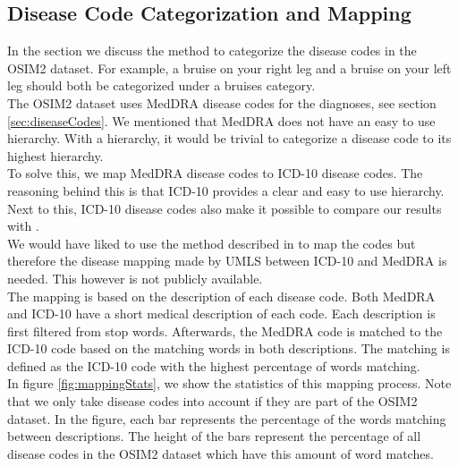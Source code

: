 \subsection{Disease Code Categorization and Mapping}
\label{sec:mapping}

In the section we discuss the method to categorize the disease codes in the OSIM2 dataset.  For example, a bruise on your right leg and a bruise on your left leg should both be categorized under a bruises category. \\

The OSIM2 dataset uses MedDRA disease codes for the diagnoses, see section \ref{sec:diseaseCodes}. We mentioned that MedDRA does not have an easy to use hierarchy. With a hierarchy, it would be trivial to categorize a disease code to its highest hierarchy. \\
To solve this, we map MedDRA disease codes to ICD-10 disease codes. The reasoning behind this is that ICD-10 provides a clear and easy to use hierarchy. Next to this, ICD-10 disease codes also make it possible to compare our results with \cite{Brunak:article}. \\
We would have liked to use the method described in \cite{icd10Mapping:article} to map the codes but therefore the disease mapping made by UMLS between ICD-10 and MedDRA is needed. This however is not publicly available. \\

The mapping is based on the description of each disease code. Both MedDRA and ICD-10 have a short medical description of each code. Each description is first filtered from stop words. Afterwards, the MedDRA code is matched to the ICD-10 code based on the matching words in both descriptions. The matching is defined as the ICD-10 code with the highest percentage of words matching. \\

In figure \ref{fig:mappingStats}, we show the statistics of this mapping process. Note that we only take disease codes into account if they are part of the OSIM2 dataset. In the figure, each bar represents the percentage of the words matching between descriptions. The height of the bars represent the percentage of all disease codes in the OSIM2 dataset which have this amount of word matches. \\

